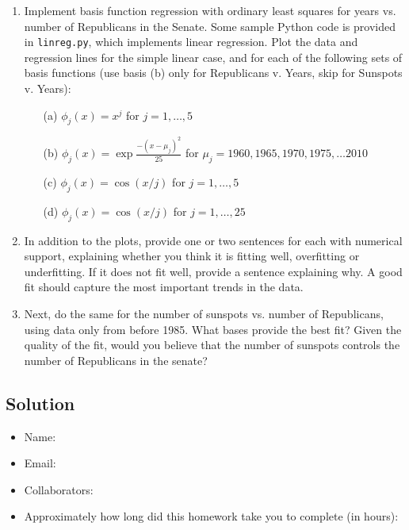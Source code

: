 \documentclass[submit]{harvardml}
\begin{document}
\begin{problem}
\begin{enumerate}
\item Implement basis function regression with ordinary least squares for
years vs. number of Republicans in the Senate. Some sample Python code
is provided in \verb|linreg.py|, which implements linear regression.
Plot the data and regression lines for the simple linear case, and for
each of the following sets of basis functions (use basis (b) only for Republicans v. Years, skip for Sunspots v. Years):
\begin{enumerate}
	\item[(a)] $\phi_j(x) = x^j$ for $j=1, \ldots, 5$ 
    \item[(b)] $\phi_j(x) = \exp{\frac{-(x-\mu_j)^2}{25}}$ for $\mu_j=1960, 1965, 1970, 1975, \ldots 2010$
	\item[(c)] $\phi_j(x) = \cos(x / j)$ for $j=1, \ldots, 5$
	\item[(d)] $\phi_j(x) = \cos(x / j)$ for $j=1, \ldots, 25$
\end{enumerate}

\item In addition to the plots, provide one or two sentences for each with
numerical support, explaining whether you think it is fitting well,
overfitting or underfitting.  If it does not fit well, provide a
sentence explaining why. A good fit should capture the most important
trends in the data.

\item Next, do the same for the number of sunspots vs. number of
Republicans, using data only from before 1985.  What bases provide the
best fit?  Given the quality of the fit, would you believe that the
number of sunspots controls the number of Republicans in the senate?

\end{enumerate}

\end{problem}

\subsection*{Solution}


\newpage
\begin{problem}[Administrative]
\leavevmode
\begin{itemize}
    \item Name:
    \item Email:
    \item Collaborators:
    \item Approximately how long did this homework take you to complete (in hours):   
\end{itemize}
\end{problem}
\end{document}
